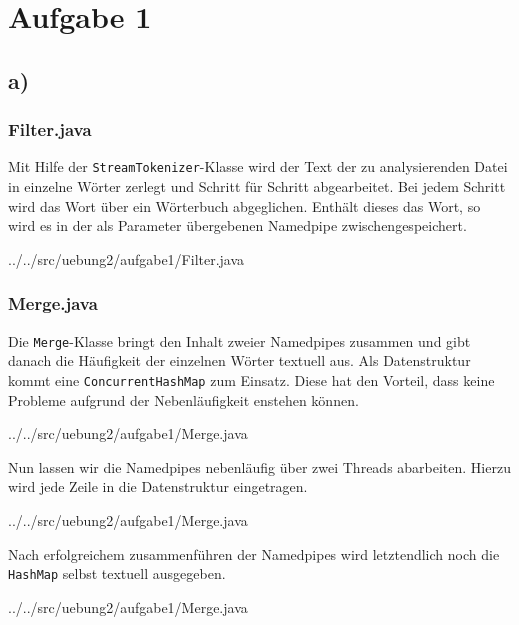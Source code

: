 \section*{Aufgabe 1}
\subsection*{a)}
\subsubsection*{Filter.java}
	Mit Hilfe der \texttt{StreamTokenizer}-Klasse wird der Text der zu analysierenden Datei in einzelne Wörter zerlegt und Schritt für Schritt abgearbeitet.
	Bei jedem Schritt wird das Wort über ein Wörterbuch abgeglichen. Enthält dieses das Wort, so wird es in der als Parameter übergebenen Namedpipe zwischengespeichert.
	
	{../../src/uebung2/aufgabe1/Filter.java}

\subsubsection*{Merge.java}
	Die \texttt{Merge}-Klasse bringt den Inhalt zweier Namedpipes zusammen und gibt danach die Häufigkeit der einzelnen Wörter textuell aus.
	Als Datenstruktur kommt eine \texttt{ConcurrentHashMap} zum Einsatz. Diese hat den Vorteil, dass keine Probleme aufgrund der Nebenläufigkeit enstehen können.
	
	{../../src/uebung2/aufgabe1/Merge.java}

	Nun lassen wir die Namedpipes nebenläufig über zwei Threads abarbeiten. Hierzu wird jede Zeile in die Datenstruktur eingetragen.
	
	{../../src/uebung2/aufgabe1/Merge.java}

	Nach erfolgreichem zusammenführen der Namedpipes wird letztendlich noch die \texttt{HashMap} selbst textuell ausgegeben.
	
	{../../src/uebung2/aufgabe1/Merge.java}
